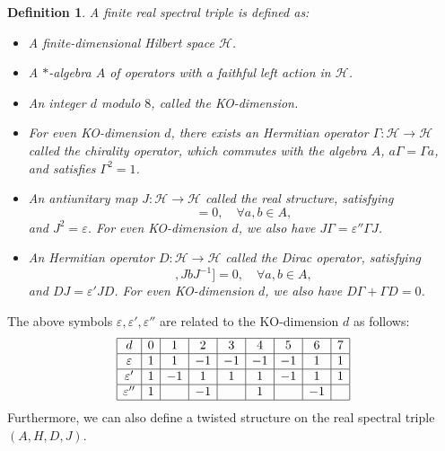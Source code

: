 \documentclass[a4paper,11pt]{article}
\newtheorem{definition}{Definition}
\begin{document}
\begin{definition}
  \cite{Bigatti1} A finite real spectral triple is defined as:
  \begin{itemize}
    \item A finite-dimensional Hilbert space $\mathcal{H}$.
    
    \item A $\ast$-algebra $A$ of operators with a faithful left action in
    $\mathcal{H}$.
    
    \item An integer $d$ modulo $8$, called the KO-dimension.
    
    \item For even KO-dimension $d$, there exists an Hermitian operator $\Gamma
    : \mathcal{H} \rightarrow \mathcal{H}$ called the chirality operator,
    which commutes with the algebra $A$, $a \Gamma = \Gamma a$, and satisfies
    $\Gamma^2 = 1$.
    
    \item An antiunitary map $J : \mathcal{H} \rightarrow \mathcal{H}$ called
    the real structure, satisfying
    \begin{equation}
      [a, JbJ^{- 1}] = 0, \quad \forall a, b \in A,
    \end{equation}
    and $J^2 = \varepsilon$. For even KO-dimension $d$, we also have $J \Gamma
    = \varepsilon'' \Gamma J$.
    
    \item An Hermitian operator $D : \mathcal{H} \rightarrow \mathcal{H}$
    called the Dirac operator, satisfying
    \begin{equation}
      [[D, a], JbJ^{- 1}] = 0, \quad \forall a, b \in A,
    \end{equation}
    and $DJ = \varepsilon' JD$. For even KO-dimension $d$, we also have $D
    \Gamma + \Gamma D = 0$.
  \end{itemize}
\end{definition}

The above symbols $\varepsilon, \varepsilon', \varepsilon''$ are related to
the KO-dimension $d$ as follows:
\[ \begin{array}{|c|c|c|c|c|c|c|c|c|}
     \hline
     d & 0 & 1 & 2 & 3 & 4 & 5 & 6 & 7\\
     \hline
     \varepsilon & 1 & 1 & - 1 & - 1 & - 1 & - 1 & 1 & 1\\
     \hline
     \varepsilon' & 1 & - 1 & 1 & 1 & 1 & - 1 & 1 & 1\\
     \hline
     \varepsilon'' & 1 &  & - 1 &  & 1 &  & - 1 & \\
     \hline
   \end{array} \]
Furthermore, we can also define a twisted structure on the real spectral
triple $(A, H, D, J)$.
\end{document}
